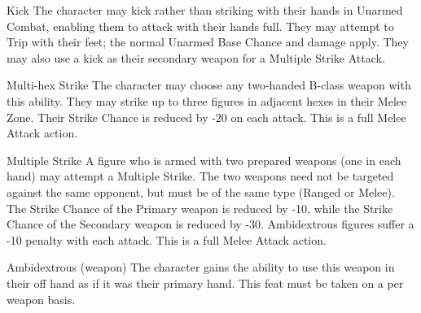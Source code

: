 \begin{Description}

\item[Kick] The character may kick rather than striking with their
hands in Unarmed Combat, enabling them to attack with their hands
full. They may attempt to Trip with their feet; the normal Unarmed
Base Chance and damage apply. They may also use a kick as their
secondary weapon for a Multiple Strike Attack.

\item[Multi-hex Strike] The character may choose any two-handed
B-class weapon with this ability.  They may strike up to three figures
in adjacent hexes in their Melee Zone. Their Strike Chance is reduced
by -20 on each attack.  This is a full Melee Attack action.

\item[Multiple Strike] A figure who is armed with two prepared weapons
(one in each hand) may attempt a Multiple Strike. The two weapons need
not be targeted against the same opponent, but must be of the same
type (Ranged or Melee). The Strike Chance of the Primary weapon is
reduced by -10, while the Strike Chance of the Secondary weapon is
reduced by -30. Ambidextrous figures suffer a -10 penalty with each
attack. This is a full Melee Attack action.

\item[Ambidextrous (weapon)] The character gains the ability to use
this weapon in their off hand as if it was their primary hand.  This
feat must be taken on a per weapon basis.

\end{Description}

